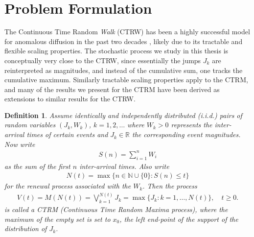 \documentclass[honours,12pt]{unswthesis}
\newcommand{\R}{\mathbb{R}}
\newcommand{\1}{\mathbf 1}
\newtheorem{definition}[equation]{Definition}
\numberwithin{equation}{section}
\theoremstyle{definition}
\theoremstyle{remark}
\begin{document}
\section{Problem Formulation}
The Continuous Time Random \emph{Walk} (CTRW) has been a highly successful 
model for anomalous diffusion in the past two decades 
\cite{Metzler2000,HLS2010b}, likely due to its tractable and flexible scaling
properties. The stochastic process we study in this thesis is conceptually very close
to the CTRW, since essentially the jumps $J_k$ are reinterpreted as 
magnitudes, and instead of the cumulative sum, one tracks the cumulative 
maximum. Similarly tractable scaling properties apply to the CTRM, and many of the results we present for the CTRM have been derived as extensions to similar results for the CTRW.\\

\begin{definition}
Assume identically and independently distributed (i.i.d.) pairs of random variables $(J_k, W_k)$, $k = 1, 2, \ldots$
where $W_k > 0$ represents the inter-arrival times of certain events and 
$J_k \in \R$ the corresponding event magnitudes. Now write
\begin{align}
	S(n)=\sum_{i=1}^n W_i
\end{align}
as the sum of the first $n$ inter-arrival times. Also write
\begin{align} \label{eq:renewal-process}
N(t) = \max\{n \in \mathbb N \cup \{0\}: S(n) \le t\}
\end{align}
for the renewal process associated with the $W_k$. Then the process
\begin{align}
V(t)=M(N(t)) = \bigvee_{k=1}^{N(t)} J_k
= \max\{J_k: k = 1, \ldots, N(t)\}, \quad t \ge 0.
\end{align}
is called a CTRM (Continuous Time Random Maxima process), where the maximum of 
the empty set is set to $x_0$, the left end-point of the support of the distribution
of $J_k$.\\
\end{definition}
\end{document}

